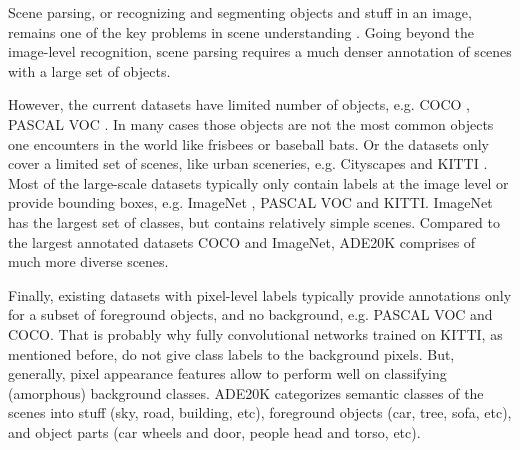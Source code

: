 \documentclass[12pt,a4paper]{report}
\newcommand{\acronym}{\MakeUppercase}
\begin{document}
	Scene parsing, or recognizing and segmenting objects and stuff in an image, remains one 
	of the key problems in scene understanding \citep{Zhou_sem}. Going beyond the image-level 
	recognition, scene parsing requires a much denser annotation of scenes with a large set 
	of objects. 
	\par
	However, the current datasets have limited number of objects, e.g. \acronym{coco} 
	\citep{coco}, \acronym{pascal voc} \citep{pascal}. In many cases those objects are not 
	the most common objects one encounters in the world like frisbees or baseball bats. 
	Or the datasets only cover a limited set of scenes, like urban sceneries, e.g. Cityscapes 
	\citep{cityscapes} and \acronym{kitti} \citep{kitti}. Most of the large-scale datasets 
	typically only contain labels at the image level or provide bounding boxes, e.g. ImageNet 
	\citep{Deng}, \acronym{pascal voc} and \acronym{kitti}. ImageNet has the largest set of 
	classes, but contains relatively simple scenes. Compared to the largest annotated datasets 
	\acronym{coco} and ImageNet, \acronym{ade20k} \citep{Zhou_pars} comprises of much more 
	diverse scenes. 
	\par
	Finally, existing datasets with pixel-level labels typically provide annotations only 
	for a subset of foreground objects, and no background, e.g. \acronym{pascal voc} and 
	\acronym{coco}. That is probably why fully convolutional networks trained on \acronym{kitti}, 
	as mentioned before, do not give class labels to the background pixels. But, generally, 
	pixel appearance features allow to perform well on classifying (amorphous) background 
	classes. \acronym{ade20k} categorizes semantic classes of the scenes into stuff (sky, 
	road, building, etc), foreground objects (car, tree, sofa, etc), and object parts (car 
	wheels and door, people head and torso, etc).
	\\
	
\end{document}

